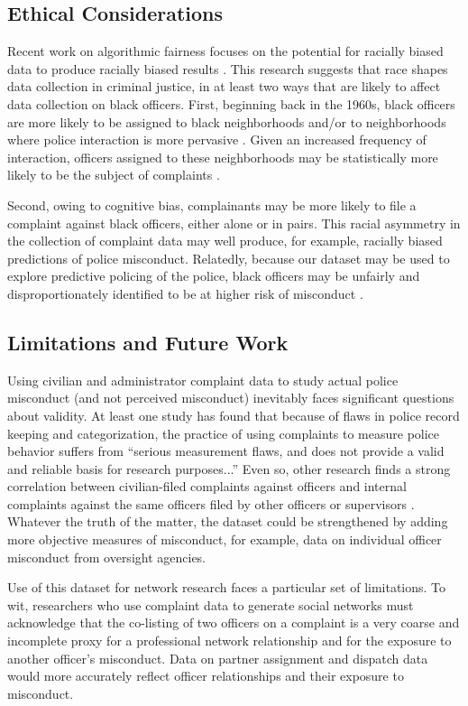 \subsection{Ethical Considerations}
Recent work on algorithmic fairness focuses on the potential for racially
biased data to produce racially biased results
\cite{veale2018fairness,sloane2019ai,d2020fairness}.  This research suggests
that race shapes data collection in criminal justice, in at least two ways that
are likely to affect data collection on black officers. First, beginning back
in the 1960s, black officers are more likely to be assigned to black
neighborhoods and/or to neighborhoods where police interaction is more
pervasive \cite{Kuykendall80}. Given an increased frequency of interaction,
officers assigned to these neighborhoods may be statistically more likely to be
the subject of complaints \cite{Kane06}. 

Second, owing to cognitive bias, complainants may be more likely to file a
complaint against black officers, either alone or in pairs. This racial
asymmetry in the collection of complaint data may well produce, for example,
racially biased predictions of police misconduct. Relatedly, because our
dataset may be used to explore predictive policing of the police, black
officers may be unfairly and disproportionately identified to be at higher risk
of misconduct \cite{veale2018fairness,sloane2019ai,d2020fairness,Wood19}. 

\subsection{Limitations and Future Work}
Using civilian and administrator complaint data to study actual police
misconduct (and not perceived misconduct) inevitably faces significant
questions about validity. At least one study has found that because of flaws in
police record keeping and categorization, the practice of using complaints to
measure police behavior suffers from ``serious measurement flaws, and does not
provide a valid and reliable basis for research purposes...'' \cite{Hickman16} Even so, other
research finds a strong correlation between civilian-filed complaints against
officers and internal complaints against the same officers filed by other
officers or supervisors \cite{Lersch00}. Whatever the truth of the matter, the dataset could be
strengthened by adding more objective measures of misconduct, for example, data
on individual officer misconduct from oversight agencies.

Use of this dataset for network research faces a particular set of limitations.
To wit, researchers who use complaint data to generate social networks must
acknowledge that the co-listing of two officers on a complaint is a very coarse
and incomplete proxy for a professional network relationship and for the
exposure to another officer’s misconduct. Data on partner assignment and
dispatch data would more accurately reflect officer relationships and their
exposure to misconduct. 

